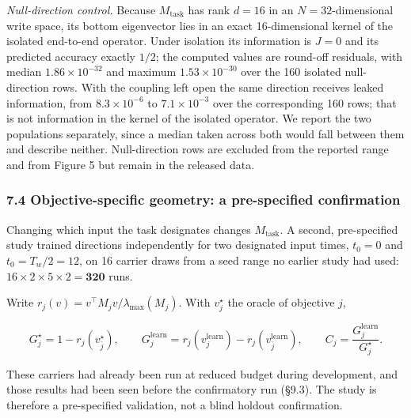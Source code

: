 \documentclass[
  10pt,
]{article}
\begin{document}
\emph{Null-direction control.} Because \(M_{\text{task}}\) has rank
\(d=16\) in an \(N=32\)-dimensional write space, its bottom eigenvector
lies in an exact 16-dimensional kernel of the isolated end-to-end
operator. Under isolation its information is \(J=0\) and its predicted
accuracy exactly \(1/2\); the computed values are round-off residuals,
with median \(1.86\times10^{-32}\) and maximum \(1.53\times10^{-30}\)
over the 160 isolated null-direction rows. With the coupling left open
the same direction receives leaked information, from
\(8.3\times10^{-6}\) to \(7.1\times10^{-3}\) over the corresponding 160
rows; that is not information in the kernel of the isolated operator. We
report the two populations separately, since a median taken across both
would fall between them and describe neither. Null-direction rows are
excluded from the reported range and from Figure 5 but remain in the
released data.

\subsubsection{7.4 Objective-specific geometry: a pre-specified
confirmation}\label{objective-specific-geometry-a-pre-specified-confirmation}

Changing which input the task designates changes \(M_{\text{task}}\). A
second, pre-specified study trained directions independently for two
designated input times, \(t_0=0\) and \(t_0=T_w/2=12\), on 16 carrier
draws from a seed range no earlier study had used:
\(16\times2\times5\times2=\mathbf{320}\) runs.

Write \(r_j(v)=v^\top M_j v/\lambda_{\max}(M_j)\). With \(v_j^\star\)
the oracle of objective \(j\),

\[
G^\star_j=1-r_j(v^\star_{\bar j}),\qquad
G^{\text{learn}}_j=r_j(v^{\text{learn}}_j)-r_j(v^{\text{learn}}_{\bar j}),\qquad
C_j=\frac{G^{\text{learn}}_j}{G^\star_j}.
\]

These carriers had already been run at reduced budget during
development, and those results had been seen before the confirmatory run
(§9.3). The study is therefore a pre-specified validation, not a blind
holdout confirmation.
\end{document}
